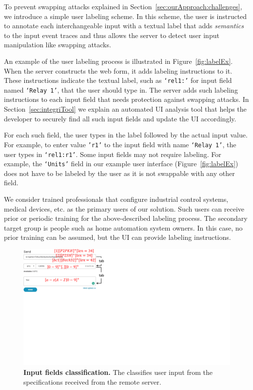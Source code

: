 To prevent swapping attacks explained in Section~\ref{sec:ourApproach:challenges}, we introduce a simple user labeling scheme. In this scheme, the user is instructed to annotate each interchangeable input with a textual label that adds \emph{semantics} to the input event traces and thus allows the server to detect user input manipulation like swapping attacks.

An example of the user labeling process is illustrated in Figure~\ref{fig:labelEx}. When the server constructs the web form, it adds labeling instructions to it. These instructions indicate the textual label, such as \texttt{`rel1:'} for input field named \texttt{`Relay 1'}, that the user should type in. The server adds such labeling instructions to each input field that needs protection against swapping attacks. In Section~\ref{sec:integriTool} we explain an automated UI analysis tool that helps the developer to securely find all such input fields and update the UI accordingly.

For each such field, the user types in the label followed by the actual input value. For example, to enter value \texttt{'r1'} to the input field with name \texttt{`Relay 1'}, the user types in \texttt{`rel1:r1'}. Some input fields may not require labeling. For example, the \texttt{`Units'} field in our example user interface (Figure~\ref{fig:labelEx}) does not have to be labeled by the user as it is not swappable with any other field.

We consider trained professionals that configure industrial control systems, medical devices, etc. as the primary users of our solution. Such users can receive prior or periodic training for the above-described labeling process. The secondary target group is people such as home automation system owners. In this case, no prior training can be assumed, but the UI can provide labeling instructions.


\iffalse
\begin{figure}[t]
 \centering
 \includegraphics[trim={0 12cm 20cm 0},clip,width=0.8\linewidth]{chapters/IntegriKey/images/InputClassify.pdf}
 \caption{\textbf{Input fields classification.} The \device classifies user input from the specifications received from the remote server.} \vspace{-20pt}
 \label{fig:inputClassification}
\end{figure}

